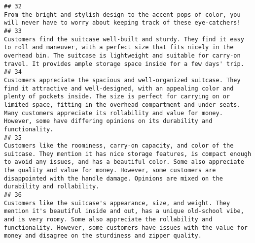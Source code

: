 \documentclass[
]{article}
\begin{document}
\begin{verbatim}
## 32                                                                                                                                                                                                                                                                                                                                                                                                                                                                                  From the bright and stylish design to the accent pops of color, you will never have to worry about keeping track of these eye-catchers!  
## 33                                                                                                                                                                                                                                                                                                                                            Customers find the suitcase well-built and sturdy. They find it easy to roll and maneuver, with a perfect size that fits nicely in the overhead bin. The suitcase is lightweight and suitable for carry-on travel. It provides ample storage space inside for a few days' trip.
## 34                                                                                                                                                                                                       Customers appreciate the spacious and well-organized suitcase. They find it attractive and well-designed, with an appealing color and plenty of pockets inside. The size is perfect for carrying on or limited space, fitting in the overhead compartment and under seats. Many customers appreciate its rollability and value for money. However, some have differing opinions on its durability and functionality.
## 35                                                                                                                                                                                                                                                      Customers like the roominess, carry-on capacity, and color of the suitcase. They mention it has nice storage features, is compact enough to avoid any issues, and has a beautiful color. Some also appreciate the quality and value for money. However, some customers are disappointed with the handle damage. Opinions are mixed on the durability and rollability.
## 36                                                                                                                                                                                                                                                                                           Customers like the suitcase's appearance, size, and weight. They mention it's beautiful inside and out, has a unique old-school vibe, and is very roomy. Some also appreciate the rollability and functionality. However, some customers have issues with the value for money and disagree on the sturdiness and zipper quality.

\end{verbatim}
\end{document}
